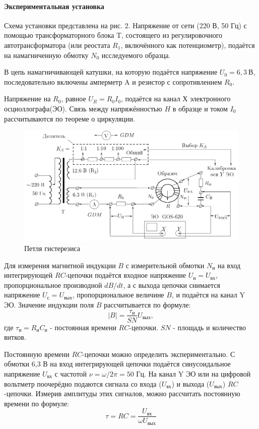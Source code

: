 \documentclass[a4paper,12pt]{article}
\begin{document}
\paragraph{Экспериментальная установка\\}
Схема установки представлена на рис. 2. Напряжение от сети (220 В, 50 Гц) с помощью трансформаторного блока T, состоящего из регулировочного автотрансформатора (или реостата $R_1$, включённого как потенциометр), подаётся на намагниченную обмотку $N_0$ исследуемого образца.\par
В цепь намагничивающей катушки, на которую подаётся напряжение $U_0 = 6,3~В$, последовательно включены амперметр A и резистор с сопротивлением $R_0$.\par 
Напряжение на $R_0$, равное $U_R = R_0 I_0$, подаётся на канал Х электронного осциоллографа(ЭО). Связь между напряжённостью $H$ в образце и током $I_0$ рассчитываются по теореме о циркуляции.\par
\newpage
\begin{figure}[!h]
\centering
\includegraphics[width=0.9\linewidth]{установка.png}
\caption{Петля гистерезиса}
\label{fig:mpr}
\end{figure}
Для измерения магнитной индукции $B$ с измерительной обмотки $N_и$ на вход интегрирующей $RC$-цепочки подаётся входное напряжение $U_и=U_{вх}$, пропорциональное производной $dB/dt$, а с выхода цепочки снимается напряжение $U_с = U_{вых}$, пропорциональное величине $B$, и подаётся на канал Y ЭО. Значение индукции поля $B$ рассчитывается по формуле:
\begin{equation}
    |B|=\frac{\tau_и}{SN}U_{вых},
\end{equation}
где $\tau_и = R_и C_и$ - постоянная времени $RC$-цепочки. $SN$ - площадь и количество витков.\par
Постоянную времени $RC$-цепочки можно определить экспериментально. С обмотки 6,3 В на вход интегрирующей цепочки подаётся синусоидальное напряжение $U_{вх}$ с частотой $\nu = \omega/2\pi=50$ Гц. На канал Y ЭО или на цифровой вольтметр поочерёдно подаются сигнала со входа ($U_{вх}$) и выхода ($U_{вых}$) $RC$-цепочки. Измерив амплитуды этих сигналов, можно рассчитать постоянную времени по формуле:
\begin{equation}
    \tau = RC = \frac{U_{вх}}{\omega U_{вых}}
\end{equation}
\end{document}
